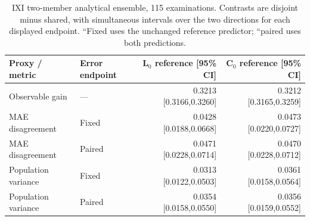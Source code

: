 \begin{table}[t]\centering\small
\caption{IXI two-member analytical ensemble, 115 examinations. Contrasts are disjoint minus shared, with simultaneous intervals over the two directions for each displayed endpoint. ``Fixed uses the unchanged reference predictor; ``paired uses both predictions.}
\begin{tabular}{llrr}\toprule
Proxy / metric & Error endpoint & L$_0$ reference [95\% CI] & C$_0$ reference [95\% CI]\\\midrule
Observable gain & --- & 0.3213 [0.3166,0.3260] & 0.3212 [0.3165,0.3259]\\
MAE disagreement & Fixed & 0.0428 [0.0188,0.0668] & 0.0473 [0.0220,0.0727]\\
MAE disagreement & Paired & 0.0471 [0.0228,0.0714] & 0.0470 [0.0228,0.0712]\\
Population variance & Fixed & 0.0313 [0.0122,0.0503] & 0.0361 [0.0158,0.0564]\\
Population variance & Paired & 0.0354 [0.0158,0.0550] & 0.0356 [0.0159,0.0552]\\
\bottomrule\end{tabular}\end{table}